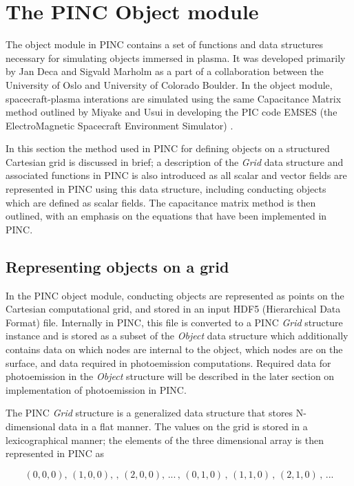 \section{The PINC Object module}
The object module in PINC contains a set of functions and data structures necessary for simulating objects immersed in plasma. It was developed primarily by Jan Deca and Sigvald Marholm as a part of a collaboration between the University of Oslo and University of Colorado Boulder. In the object module, spacecraft-plasma interations are simulated using the same Capacitance Matrix method outlined by Miyake and Usui in developing the PIC code EMSES (the ElectroMagnetic Spacecraft Environment Simulator) \parencite{Miyake2009}. 

In this section the method used in PINC for defining objects on a structured Cartesian grid is discussed in brief; a description of the \textit{Grid} data structure and associated functions in PINC is also introduced as all scalar and vector fields are represented in PINC using this data structure, including conducting objects which are defined as scalar fields. The capacitance matrix method is then outlined, with an emphasis on the equations that have been implemented in PINC. 


\subsection{Representing objects on a grid}
In the PINC object module, conducting objects are represented as points on the Cartesian computational grid, and stored in an input HDF5 (Hierarchical Data Format) file. Internally in PINC, this file is converted to a PINC \textit{Grid} structure instance and is stored as a subset of the \textit{Object} data structure which additionally contains data on which nodes are internal to the object, which nodes are on the surface, and data required in photoemission computations. Required data for photoemission in the \textit{Object} structure will be described in the later section on implementation of photoemission in PINC.

The PINC \textit{Grid} structure is a generalized data structure that stores N-dimensional data in a flat manner. The values on the grid is stored in a lexicographical manner; the elements of the three dimensional array is then represented in PINC as

\begin{equation*}
    (0,0,0), \, (1,0,0), \,, \, (2,0,0), \, ... \, , \, (0,1,0) \,, \, (1,1,0) \,, \, (2,1,0) \,, \, ...
\end{equation*}

